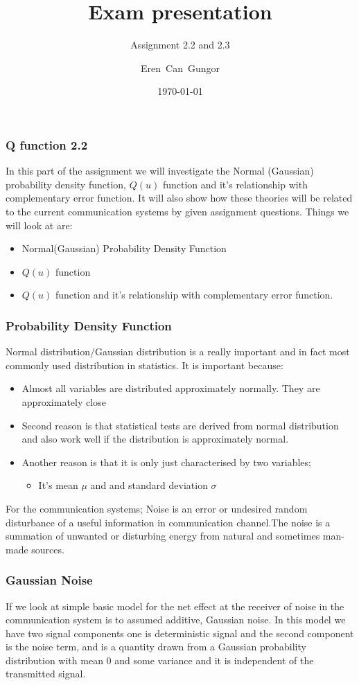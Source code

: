 \documentclass{beamer}
\title{Exam presentation}
\subtitle{Assignment 2.2 and 2.3}
\author[Eren]{Eren~Can~Gungor\inst{1}}
\institute[DTU]
{
	\inst{1}
	Technical University of Denmark\\
	Digital Communication
}
\date{\today}
\begin{document}
\frame{\titlepage}

\begin{frame}
	\frametitle{ Q function 2.2}
In this part of the assignment we will investigate the  Normal (Gaussian) probability density function, $Q(u)$ function and it's relationship with complementary error function. It will also show how these theories will be related to the current communication systems by given assignment questions. Things we will look at are:
	
	\begin{itemize}
		\item Normal(Gaussian) Probability Density Function
		\item $Q(u)$ function
		\item $Q(u)$ function and it's relationship with complementary error function.
	\end{itemize}
\end{frame}

\begin{frame}
	\frametitle{Probability Density Function}

Normal distribution/Gaussian distribution is a really important and in fact most commonly used distribution in statistics.  It is important because:
	\begin{itemize}
		\item Almost all variables are distributed approximately normally. They are approximately close
		\item Second reason is that statistical tests are derived from normal distribution and also work well if the distribution is approximately normal.
		\item Another reason is that it is only just characterised by two variables;
			\begin{itemize}
				\item It's mean $\mu$ and and standard deviation $\sigma$ 
			\end{itemize}
	\end{itemize}
For the communication systems;
Noise is an error or undesired random disturbance of a useful information in communication channel.The noise is a summation of unwanted or disturbing energy from natural and sometimes man-made sources.
\end{frame}
\begin{frame}
	\frametitle{Gaussian Noise}
If we look at simple basic model for the net effect at the receiver of noise in the communication system is to assumed additive, Gaussian noise. In this model we have two signal components one is deterministic signal and  the second component is the noise term, and is a quantity drawn from a Gaussian probability distribution with mean $0$ and some variance and it is  independent of the transmitted signal.
\end{frame}
\end{document}
